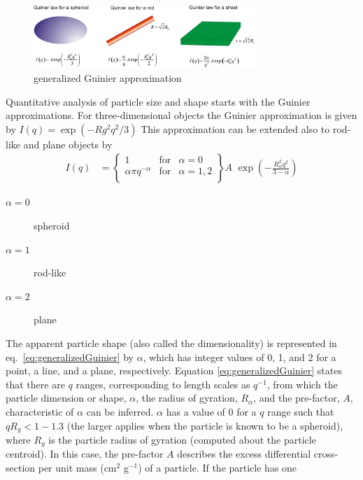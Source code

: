 \begin{figure}[htb]
\begin{center}
\includegraphics[width=0.75\textwidth]{generalizedGuinier_q.png}
\end{center}
\caption{generalized Guinier approximation}
\end{figure}
Quantitative analysis of particle size and shape starts with the
Guinier approximations. For three-dimensional objects the Guinier
approximation is given by $I(q) = \exp(-Rg^2q^2/3)$ This
approximation can be extended also to rod-like and plane objects by \cite{Fratzl1994,Hjelm1992,Hjelm1995,Hjelm2000}
\begin{align}
I(q) &= \left\{
\begin{array}{lll}
  1 & \mbox{for} & \alpha=0 \\
  \alpha \pi q^{-\alpha} & \mbox{for} & \alpha=1,2 \\
\end{array}
\right\} A \,\, \exp\left(-\frac{R_\alpha^2 q^2}{3-\alpha}\right)
\label{eq:generalizedGuinier}
\end{align}
\begin{description}
\item[$\alpha=0$] spheroid
\item[$\alpha=1$] rod-like
\item[$\alpha=2$] plane
\end{description}
The apparent particle shape (also called the dimensionality) is
represented in eq.\ \ref{eq:generalizedGuinier} by $\alpha$, which
has integer values of 0, 1, and 2 for a point, a line, and a plane,
respectively. Equation \ref{eq:generalizedGuinier} states that there
are $q$ ranges, corresponding to length scales as $q^{-1}$, from
which the particle dimension or shape, $\alpha$, the radius of
gyration, $R_\alpha$, and the pre-factor, $A$, characteristic of
$\alpha$ can be inferred. $\alpha$ has a value of 0 for a $q$ range
such that $qR_g < 1-1.3$ (the larger applies when the particle is
known to be a spheroid), where $R_g$ is the particle radius of
gyration (computed about the particle centroid). In this case, the
pre-factor $A$ describes the excess differential cross-section per
unit mass (cm$^2$ g$^{-1}$) of a particle. If the particle has one
